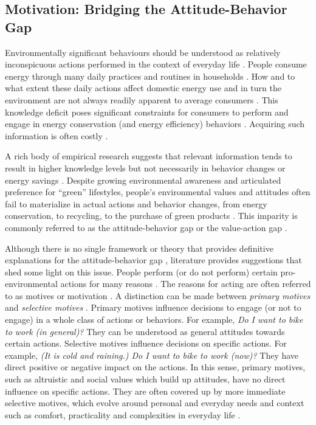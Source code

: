 \subsection{Motivation: Bridging the Attitude-Behavior Gap}

Environmentally significant behaviours should be understood as relatively inconspicuous actions performed in the context of everyday life \citep{Burgess2008}. People consume energy through many daily practices and routines in households \citep{Burgess2008,Hargreaves2010, Fehrenbacher2011,Burchell2014}. How and to what extent these daily actions affect domestic energy use and in turn the environment are not always readily apparent to average consumers  \citep{Burgess2008,Delmas2013}. This knowledge deficit poses significant constraints for consumers to perform and engage in energy conservation (and energy efficiency) behaviors \citep{Schultz2002,Burchell2014}. Acquiring such information is often costly  \citep{Delmas2013}. 

A rich body of empirical research suggests that relevant information tends to result in higher knowledge levels but not necessarily in behavior changes or energy savings  \citep{Abrahamse2005,Delmas2013,Burchell2014,Asensio2015}. Despite growing environmental awareness and articulated preference for ``green'' lifestyles, people's environmental values and attitudes often fail to materialize in actual actions and behavior changes, from energy conservation, to recycling,  to the purchase of green products  \citep{Schultz2002,Abrahamse2005,Claudy2013}. This imparity is commonly referred to as the attitude-behavior gap or the value-action gap  \citep{Blake1999,Kollmuss2002,Claudy2013}. 

Although there is no single framework or theory that provides definitive explanations for the attitude-behavior gap  \citep{Kollmuss2002,Schultz2014}, literature provides suggestions that shed some light on this issue. People perform (or do not perform) certain pro-environmental actions for many reasons  \citep{Schultz2002}. The reasons for acting are often referred to as motives or motivation  \citep{Parfit1997,Moisander2007}. A distinction can be made between \textit{primary motives} and \textit{selective motives}  \citep{Kollmuss2002,Moisander2007}. Primary motives influence decisions to engage (or not to engage) in a whole class of actions or behaviors. For example, \textit{Do I want to bike to work (in general)?} They can be understood as general attitudes towards certain actions. Selective motives influence decisions on specific actions. For example, \textit{(It is cold and raining.) Do I want to bike to work (now)?} They have direct positive or negative impact on the actions. In this sense, primary motives, such as altruistic and social values which build up attitudes, have no direct influence on specific actions. They are often covered up by more immediate selective motives, which evolve around personal and everyday needs and context such as comfort, practicality and complexities in everyday life  \citep{Kollmuss2002,Berthou2013,Selvefors2015}. 

